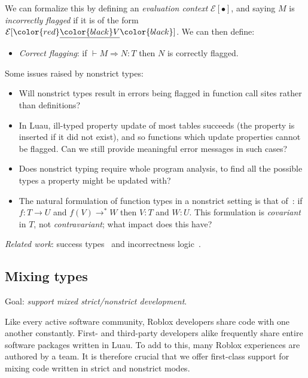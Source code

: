 \documentclass[acmsmall]{acmart}
\newcommand{\squnder}[1]{\color{red}\underline{{\color{black}#1}}\color{black}}
\newcommand{\evCtx}{\mathcal{E}}
\begin{document}
We can formalize this by defining an \emph{evaluation context}
$\evCtx[\bullet]$, and saying $M$ is \emph{incorrectly flagged}
if it is of the form $\evCtx[\squnder{V}]$. We can then define:
\begin{itemize}
\item \emph{Correct flagging}: if ${} \vdash M \Rightarrow N : T$
  then $N$ is correctly flagged.
\end{itemize}
Some issues raised by nonstrict types:
\begin{itemize}

\item Will nonstrict types result in errors being flagged in function call sites
  rather than definitions?

\item In Luau, ill-typed property update of most tables succeeds
  (the property is inserted if it did not exist), and so functions which
  update properties cannot be flagged. Can we still provide meaningful
  error messages in such cases?

\item Does nonstrict typing require whole program analysis,
  to find all the possible types a property might be updated with?

\item The natural formulation of function types in a nonstrict setting
  is that of~\cite{SuccessTyping}: if $f: T \rightarrow U$ and $f(V) \rightarrow^* W$
  then $V:T$ and $W:U$. This formulation is \emph{covariant} in $T$,
  not \emph{contravariant}; what impact does this have?
  
\end{itemize}
\emph{Related work}: success types~\cite{SuccessTyping} and incorrectness logic~\cite{IncorrectnessLogic}.

\subsection{Mixing types}

Goal: \emph{support mixed strict/nonstrict development}.

Like every active software community, Roblox developers share code
with one another constantly.  First- and third-party developers alike
frequently share entire software packages written in Luau.  To add to
this, many Roblox experiences are authored by a team.  It is therefore
crucial that we offer first-class support for mixing code written in
strict and nonstrict modes.
\end{document}

